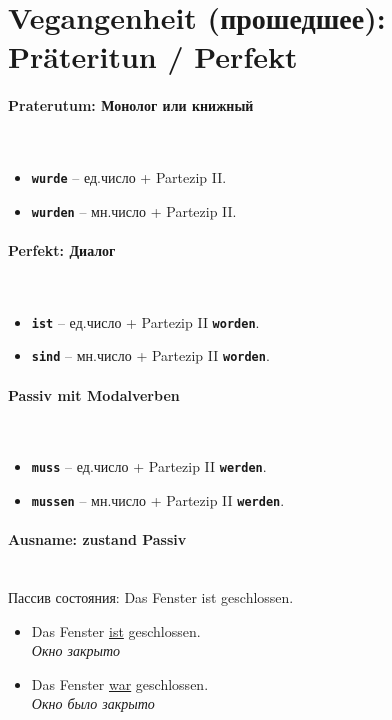 \documentclass[12pt,a4paper]{report}
\newcommand{\term}[1]{\texttt{\textbf{#1}}}
\newcommand{\satzew}[1]{\underline{#1}}
\newcommand{\ubersatze}[1]{\textit{#1}}
\begin{document}
\section{Vegangenheit (прошедшее): Präteritun / Perfekt}

\paragraph{Praterutum: Монолог или книжный} ~\\
\begin{itemize}
\item \term{wurde} -- ед.число + Partezip II.
\item \term{wurden} -- мн.число + Partezip II.
\end{itemize}

\paragraph{Perfekt: Диалог} ~\\
\begin{itemize}
\item \term{ist} -- ед.число + Partezip II \term{worden}.
\item \term{sind} -- мн.число + Partezip II \term{worden}.
\end{itemize}

\paragraph{Passiv mit Modalverben} ~\\
\begin{itemize}
\item \term{muss} -- ед.число + Partezip II \term{werden}.
\item \term{mussen} -- мн.число + Partezip II \term{werden}.
\end{itemize}

\paragraph{Ausname: zustand Passiv} ~\\

Пассив состояния: Das Fenster ist geschlossen.

\begin{itemize}
\item Das Fenster \satzew{ist} geschlossen.
~\\ \ubersatze{Окно закрыто}
\item Das Fenster \satzew{war} geschlossen.
~\\ \ubersatze{Окно было закрыто}
\end{itemize}
\end{document}
